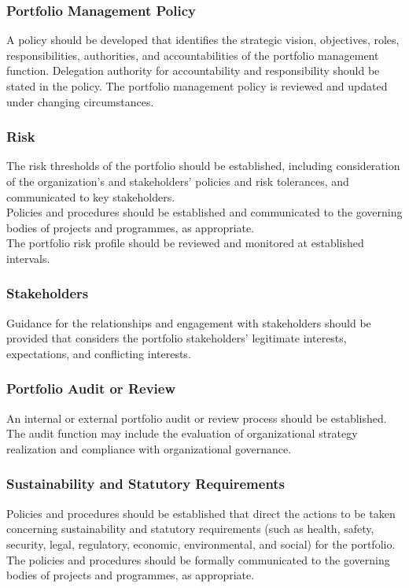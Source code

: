 \documentclass[letterpaper,10pt,english]{jupyterBook}
\begin{document}
\subsubsection{Portfolio Management Policy}
\label{\detokenize{PM/ppm:portfolio-management-policy}}
\sphinxAtStartPar
A policy should be developed that identifies the strategic vision, objectives, roles, responsibilities,
authorities, and accountabilities of the portfolio management function. Delegation authority for accountability and responsibility should be stated in the policy.
The portfolio management policy is reviewed and updated under changing circumstances.


\subsubsection{Risk}
\label{\detokenize{PM/ppm:risk}}
\sphinxAtStartPar
The risk thresholds of the portfolio should be established, including consideration of the organization’s and stakeholders’ policies and risk tolerances, and communicated to key stakeholders. \\
Policies
and procedures should be established and communicated to the governing bodies of projects and programmes, as appropriate. \\
The portfolio risk profile should be reviewed and monitored at established intervals.


\subsubsection{Stakeholders}
\label{\detokenize{PM/ppm:stakeholders}}
\sphinxAtStartPar
Guidance for the relationships and engagement with stakeholders should be provided that considers the portfolio stakeholders’ legitimate interests, expectations, and conflicting interests.


\subsubsection{Portfolio Audit or Review}
\label{\detokenize{PM/ppm:portfolio-audit-or-review}}
\sphinxAtStartPar
An internal or external portfolio audit or review process should be established. \\
The audit function may include the evaluation of organizational strategy realization and compliance with organizational governance.


\subsubsection{Sustainability and Statutory Requirements}
\label{\detokenize{PM/ppm:sustainability-and-statutory-requirements}}
\sphinxAtStartPar
Policies and procedures should be established that direct the actions to be taken concerning sustainability and statutory requirements (such as health, safety, security, legal, regulatory, economic, environmental, and social) for the portfolio. \\
The policies and procedures should be formally communicated to the governing bodies of projects and programmes, as appropriate.
\end{document}
